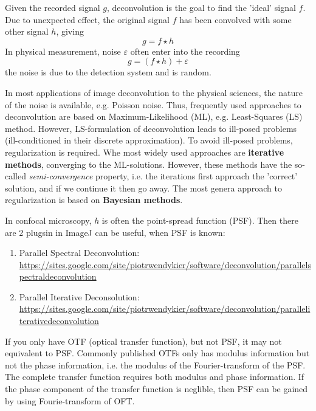 Given the recorded signal $g$, deconvolution is the goal to find the 'ideal'
signal $f$. Due to unexpected effect, the original signal $f$ has been convolved
with some other signal $h$, giving 
\begin{equation}
g = f \star h
\end{equation}
In physical measurement, noise $\varepsilon$ often enter into the recording
\begin{equation}
g = \left( f \star h \right) + \varepsilon
\end{equation}
the noise is due to the detection system and is random.

In most applications of image deconvolution to the physical sciences, the nature
of the noise is available, e.g. Poisson noise. Thus, frequently used approaches
to deconvolution are based on Maximum-Likelihood (ML), e.g. Least-Squares (LS)
method. However, LS-formulation of deconvolution leads to ill-posed problems
(ill-conditioned in their discrete approximation). To avoid ill-posed
problems, regularization is required.  Whe most widely used approaches are {\bf
iterative methods}, converging to the ML-solutions. However, these methods have
the so-called {\it semi-convergence} property, i.e. the iterations first
approach the 'correct' solution, and if we continue it then go away. The most
genera approach to regularization is based on {\bf Bayesian methods}.

In confocal microscopy, $h$ is often the point-spread function (PSF). Then there
are 2 plugsin in ImageJ can be useful, when PSF is known:
\begin{enumerate}
  \item Parallel Spectral Deconvolution:
  \url{https://sites.google.com/site/piotrwendykier/software/deconvolution/parallelspectraldeconvolution}
  \item Parallel Iterative Deconsolution:
  \url{https://sites.google.com/site/piotrwendykier/software/deconvolution/paralleliterativedeconvolution}
\end{enumerate}

\begin{framed}
If you only have OTF (optical transfer function), but not PSF, it may not
equivalent to PSF. Commonly published OTFs only has modulus information but not
the phase information, i.e. the modulus of the Fourier-transform of the PSF. The
complete transfer function requires both modulus and phase information. If the phase component of the
transfer function is neglible, then PSF can be gained by using Fourie-transform
of OFT. 	
\end{framed}

